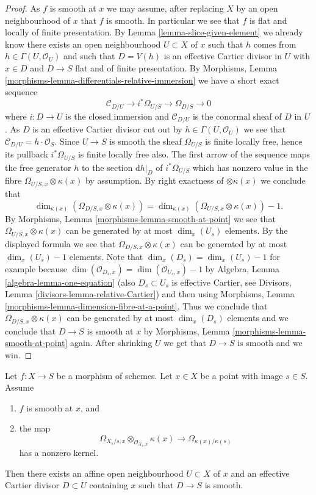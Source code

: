 \begin{proof}
As $f$ is smooth at $x$ we may assume, after replacing $X$ by an open
neighbourhood of $x$ that $f$ is smooth. In particular we see that
$f$ is flat and locally of finite presentation. By
Lemma \ref{lemma-slice-given-element}
we already know there exists an open neighbourhood $U \subset X$ of $x$
such that $h$ comes from $h \in \Gamma(U, \mathcal{O}_U)$ and such
that $D = V(h)$ is an effective Cartier divisor in $U$ with $x \in D$ and
$D \to S$ flat and of finite presentation. By
Morphisms, Lemma \ref{morphisms-lemma-differentials-relative-immersion}
we have a short exact sequence
$$
\mathcal{C}_{D/U} \to i^*\Omega_{U/S} \to \Omega_{D/S} \to 0
$$
where $i : D \to U$ is the closed immersion and $\mathcal{C}_{D/U}$
is the conormal sheaf of $D$ in $U$. As $D$ is an effective Cartier
divisor cut out by $h \in \Gamma(U, \mathcal{O}_U)$ we see that
$\mathcal{C}_{D/U} = h \cdot \mathcal{O}_S$. Since $U \to S$ is smooth
the sheaf $\Omega_{U/S}$ is finite locally free, hence its pullback
$i^*\Omega_{U/S}$ is finite locally free also. The first arrow of
the sequence maps the free generator $h$ to the section $\text{d}h|_D$
of $i^*\Omega_{U/S}$ which has nonzero value in the fibre
$\Omega_{U/S, x} \otimes \kappa(x)$ by assumption. By right exactness
of $\otimes \kappa(x)$ we conclude that
$$
\dim_{\kappa(x)} \left( \Omega_{D/S, x} \otimes \kappa(x) \right)
=
\dim_{\kappa(x)} \left( \Omega_{U/S, x} \otimes \kappa(x) \right) - 1.
$$
By
Morphisms, Lemma \ref{morphisms-lemma-smooth-at-point}
we see that $\Omega_{U/S, x} \otimes \kappa(x)$ can be generated by
at most $\dim_x(U_s)$ elements. By the displayed formula we see that
$\Omega_{D/S, x} \otimes \kappa(x)$ can be generated by at most
$\dim_x(U_s) - 1$ elements. Note that
$\dim_x(D_s) = \dim_x(U_s) - 1$ for example because
$\dim(\mathcal{O}_{D_s, x}) = \dim(\mathcal{O}_{U_s, x}) - 1$ by
Algebra, Lemma \ref{algebra-lemma-one-equation}
(also $D_s \subset U_s$ is effective Cartier, see
Divisors, Lemma \ref{divisors-lemma-relative-Cartier})
and then using
Morphisms, Lemma \ref{morphisms-lemma-dimension-fibre-at-a-point}.
Thus we conclude that $\Omega_{D/S, x} \otimes \kappa(x)$ can be generated
by at most $\dim_x(D_s)$ elements and we conclude that $D \to S$
is smooth at $x$ by
Morphisms, Lemma \ref{morphisms-lemma-smooth-at-point}
again. After shrinking $U$ we get that $D \to S$ is smooth and we win.
\end{proof}

\begin{lemma}
\label{lemma-slice-smooth-once}
Let $f : X \to S$ be a morphism of schemes.
Let $x \in X$ be a point with image $s \in S$.
Assume
\begin{enumerate}
\item $f$ is smooth at $x$, and
\item the map
$$
\Omega_{X_s/s, x} \otimes_{\mathcal{O}_{X_s, x}} \kappa(x)
\longrightarrow
\Omega_{\kappa(x)/\kappa(s)}
$$
has a nonzero kernel.
\end{enumerate}
Then there exists an affine open neighbourhood $U \subset X$ of $x$
and an effective Cartier divisor $D \subset U$ containing $x$ such that
$D \to S$ is smooth.
\end{lemma}

